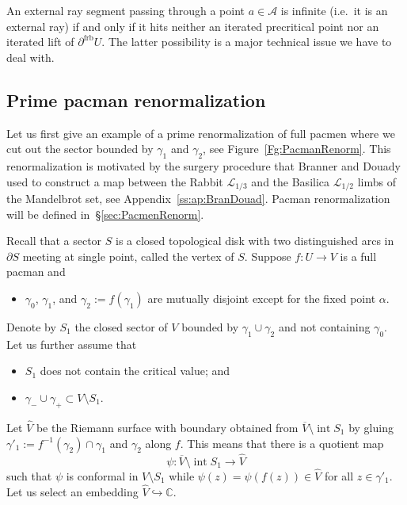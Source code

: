 \documentclass[]{amsart}
\newcommand\intr{\operatorname{int}}
\newcommand\frb{{\operatorname{frb}}}
\newcommand{\C}{\mathbb{C}}
\theoremstyle{remark}
\numberwithin{equation}{section}
\theoremstyle{definition}
\begin{document}
An external ray segment passing through a point $a\in \mathcal{A}$ is infinite (i.e.~it is an external ray) if and only if it hits neither an iterated precritical point nor an iterated lift of $\partial^{\frb} U$. The latter possibility is a major technical issue we have to deal with.
 




\subsection{Prime pacman renormalization}
\label{sec:PrimePacmenRenorm}  
Let us first give an example of a prime renormalization of full pacmen where we cut out the sector bounded by $\gamma_1$ and $\gamma_2$, see Figure~\ref{Fg:PacmanRenorm}. This renormalization is motivated by the surgery procedure that Branner and Douady \cite{BD} used to construct a map between the Rabbit $\mathcal{L}_{1/3}$ and the Basilica  $\mathcal{L}_{1/2}$ limbs of the Mandelbrot set, see Appendix~\ref{ss:ap:BranDouad}. Pacman renormalization will be defined in~\S\ref{sec:PacmenRenorm}. 


Recall that a sector $S$ is a closed topological disk with two distinguished  arcs in $\partial S$ meeting at single point, called the vertex of $S$. Suppose $f:U\to V$ is a full pacman and  
\begin{itemize}
\item[(A)] $\gamma_0$, $\gamma_1$, and $\gamma_2 :=f(\gamma_1)$ are mutually disjoint except for the fixed point $\alpha$.
\end{itemize}
Denote by  $S_{1}$ the closed sector of $V$ bounded by $\gamma_1\cup \gamma_2$ and not containing $\gamma_0$. Let us further assume that 
\begin{itemize}
\item[(B)] $S_{1}$ does not contain the critical value; and
\item[(C)]  $\gamma_-\cup \gamma_+\subset V\setminus S_{1}$. %
\end{itemize} 


 Let $\widehat V$ be the Riemann surface with boundary obtained from $\overline{V}\setminus \intr{S_{1}}$ by gluing $\gamma'_1:= f^{-1}(\gamma_2)\cap \gamma_1$ and $\gamma_2$ along $f$. This means that there is a quotient map 
 \[\psi: \overline{V}\setminus\intr{S_{1}}\to \widehat V\] such that $\psi$ is conformal in  $V\setminus S_1$ while $\psi(z)=\psi(f(z))\in \widehat V$ for all $z\in \gamma'_1$. Let us select an embedding  $\widehat V \hookrightarrow \C$.
 
\end{document}
